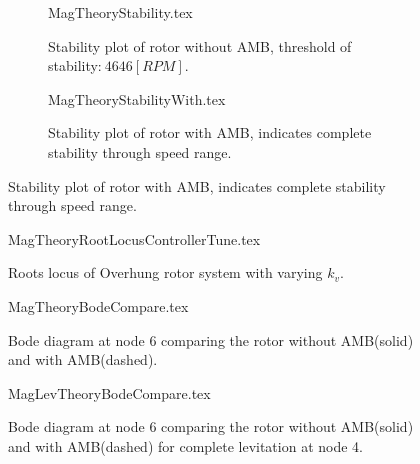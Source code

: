 \begin{figure}
	\begin{subfigure}{\textwidth/2}
		\def\width{.8\linewidth}
		\def\height{.4\linewidth}
		\centering
		{MagTheoryStability.tex}
		\caption{Stability plot of rotor without AMB, threshold of stability:$ \ 4646[RPM] $.}
		\label{fig:MagTheoryStability}
	\end{subfigure}
	\begin{subfigure}{\textwidth/2}
		\def\width{.8\linewidth}
		\def\height{.35\linewidth}
		\centering
		{MagTheoryStabilityWith.tex}
		\caption{Stability plot of rotor with AMB, indicates complete stability through speed range.}
		\label{fig:MagTheoryStabilityWith}
	\end{subfigure}
\end{figure}
\begin{figure}[!htb]
	\def\width{.7\linewidth}
	\def\height{.5\linewidth}
	\def\sep{3em}
	\centering
	{MagTheoryRootLocusControllerTune.tex}
	\caption{Roots locus of Overhung rotor system with varying $ k_v $.}
	\label{fig:MagTheoryRootLocusControllerTune}
\end{figure}
\begin{figure}[!htb]
	\def\width{.6\linewidth}
	\def\height{.4\linewidth}
	\def\sep{3em}
	\centering
	{MagTheoryBodeCompare.tex}
	\caption{Bode diagram at node 6 comparing the rotor without AMB(solid) and with AMB(dashed).}
	\label{fig:MagTheoryBodeCompare}
\end{figure}
\begin{figure}[!htb]
	\def\width{.6\linewidth}
	\def\height{.4\linewidth}
	\def\sep{3em}
	\centering
	{MagLevTheoryBodeCompare.tex}
	\caption{Bode diagram at node 6 comparing the rotor without AMB(solid) and with AMB(dashed) for complete levitation at node 4.}
	\label{fig:MagLevTheoryBodeCompare}
\end{figure}